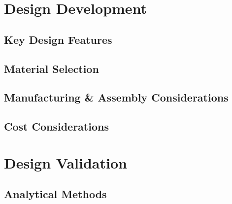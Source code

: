 \documentclass[10pt]{article}
\begin{document}
\section{Design Development}

\subsection{Key Design Features}

\subsection{Material Selection}

\subsection{Manufacturing \& Assembly Considerations}

\subsection{Cost Considerations}

\section{Design Validation}

\subsection{Analytical Methods}
\end{document}

